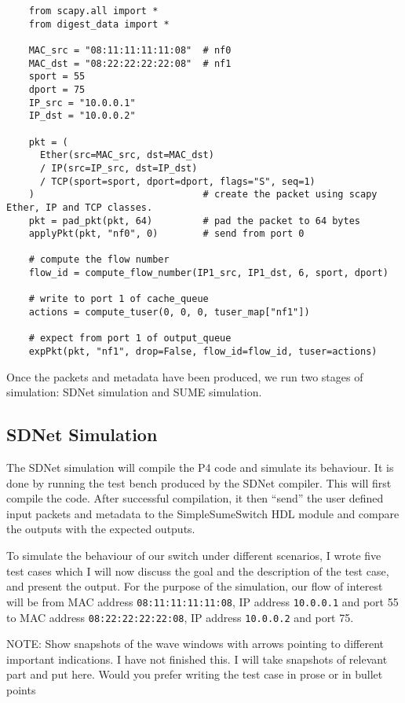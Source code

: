 {\renewcommand{\baselinestretch}{0.8}\small
	\begin{verbatim}
    from scapy.all import *
    from digest_data import *
	
    MAC_src = "08:11:11:11:11:08"  # nf0
    MAC_dst = "08:22:22:22:22:08"  # nf1
    sport = 55
    dport = 75
    IP_src = "10.0.0.1"
    IP_dst = "10.0.0.2"
	
    pkt = (
      Ether(src=MAC_src, dst=MAC_dst)
      / IP(src=IP_src, dst=IP_dst)
      / TCP(sport=sport, dport=dport, flags="S", seq=1)
    )                              # create the packet using scapy Ether, IP and TCP classes.
    pkt = pad_pkt(pkt, 64)         # pad the packet to 64 bytes
    applyPkt(pkt, "nf0", 0)        # send from port 0

    # compute the flow number
    flow_id = compute_flow_number(IP1_src, IP1_dst, 6, sport, dport)
    
    # write to port 1 of cache_queue
    actions = compute_tuser(0, 0, 0, tuser_map["nf1"])             
    
    # expect from port 1 of output_queue
    expPkt(pkt, "nf1", drop=False, flow_id=flow_id, tuser=actions)
	\end{verbatim}
}

Once the packets and metadata have been produced, we run two stages of simulation: SDNet simulation and SUME simulation.

\subsection{SDNet Simulation}
The SDNet simulation will compile the P4 code and simulate its behaviour. It is done by running the test bench produced by the SDNet compiler. This will first compile the code. After successful compilation, it then ``send'' the user defined input packets and metadata to the SimpleSumeSwitch HDL module and compare the outputs with the expected outputs. 

To simulate the behaviour of our switch under different scenarios, I wrote five test cases which I will now discuss the goal and the description of the test case, and present the output. For the purpose of the simulation, our flow of interest will be from MAC address \texttt{08:11:11:11:11:08}, IP address \texttt{10.0.0.1} and port 55 to MAC address \texttt{08:22:22:22:22:08}, IP address \texttt{10.0.0.2} and port 75.

NOTE: Show snapshots of the wave windows with arrows pointing to different important indications. I have not finished this. I will take snapshots of relevant part and put here. Would you prefer writing the test case in prose or in bullet points 

